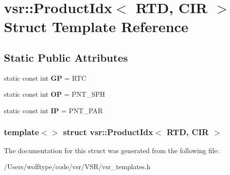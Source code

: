 \hypertarget{structvsr_1_1_product_idx_3_01_r_t_d_00_01_c_i_r_01_4}{\section{vsr\-:\-:Product\-Idx$<$ R\-T\-D, C\-I\-R $>$ Struct Template Reference}
\label{structvsr_1_1_product_idx_3_01_r_t_d_00_01_c_i_r_01_4}
}
\subsection*{Static Public Attributes}
\begin{DoxyCompactItemize}
\item 
\hypertarget{structvsr_1_1_product_idx_3_01_r_t_d_00_01_c_i_r_01_4_afe2a8cda763d18750cb5757d0ef3bc2b}{static const int {\bfseries G\-P} = R\-T\-C}\label{structvsr_1_1_product_idx_3_01_r_t_d_00_01_c_i_r_01_4_afe2a8cda763d18750cb5757d0ef3bc2b}

\item 
\hypertarget{structvsr_1_1_product_idx_3_01_r_t_d_00_01_c_i_r_01_4_ac0f17448d96dbbc234e66f14751ce1cf}{static const int {\bfseries O\-P} = P\-N\-T\-\_\-\-S\-P\-H}\label{structvsr_1_1_product_idx_3_01_r_t_d_00_01_c_i_r_01_4_ac0f17448d96dbbc234e66f14751ce1cf}

\item 
\hypertarget{structvsr_1_1_product_idx_3_01_r_t_d_00_01_c_i_r_01_4_a1bc94ce3d6324f09caec069c28c67329}{static const int {\bfseries I\-P} = P\-N\-T\-\_\-\-P\-A\-R}\label{structvsr_1_1_product_idx_3_01_r_t_d_00_01_c_i_r_01_4_a1bc94ce3d6324f09caec069c28c67329}

\end{DoxyCompactItemize}
\subsubsection*{template$<$$>$ struct vsr\-::\-Product\-Idx$<$ R\-T\-D, C\-I\-R $>$}



The documentation for this struct was generated from the following file\-:\begin{DoxyCompactItemize}
\item 
/\-Users/wolftype/code/vsr/\-V\-S\-R/vsr\-\_\-templates.\-h\end{DoxyCompactItemize}
